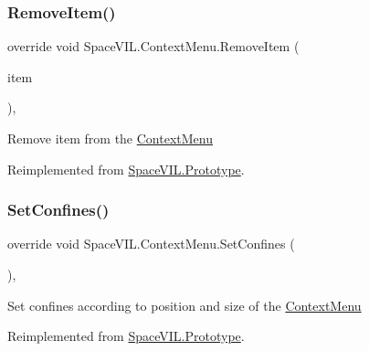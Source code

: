 \subsubsection{\texorpdfstring{Remove\+Item()}{RemoveItem()}}
{\footnotesize\ttfamily override void Space\+V\+I\+L.\+Context\+Menu.\+Remove\+Item (\begin{DoxyParamCaption}\item[{\mbox{\hyperlink{interface_space_v_i_l_1_1_core_1_1_i_base_item}{I\+Base\+Item}}}]{item }\end{DoxyParamCaption})\hspace{0.3cm}{\ttfamily [inline]}, {\ttfamily [virtual]}}



Remove item from the \mbox{\hyperlink{class_space_v_i_l_1_1_context_menu}{Context\+Menu}} 



Reimplemented from \mbox{\hyperlink{class_space_v_i_l_1_1_prototype_a7a2aabccfe6389f71d0265fa73f0ae87}{Space\+V\+I\+L.\+Prototype}}.

\mbox{\label{class_space_v_i_l_1_1_context_menu_ae8eaad3b3f7858ab1d03f5a18d94e4ca}} 
\subsubsection{\texorpdfstring{Set\+Confines()}{SetConfines()}}
{\footnotesize\ttfamily override void Space\+V\+I\+L.\+Context\+Menu.\+Set\+Confines (\begin{DoxyParamCaption}{ }\end{DoxyParamCaption})\hspace{0.3cm}{\ttfamily [inline]}, {\ttfamily [virtual]}}



Set confines according to position and size of the \mbox{\hyperlink{class_space_v_i_l_1_1_context_menu}{Context\+Menu}} 



Reimplemented from \mbox{\hyperlink{class_space_v_i_l_1_1_prototype_af063fd80d51a3c42c8f43e0e97b6b809}{Space\+V\+I\+L.\+Prototype}}.

\mbox{\label{class_space_v_i_l_1_1_context_menu_a92517e2e7ef73ccdadfa5b4016af403b}} 
